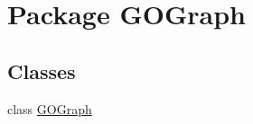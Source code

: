 \hypertarget{namespace_g_o_graph}{
\section{Package GOGraph}
\label{namespace_g_o_graph}
}
\subsection*{Classes}
\begin{DoxyCompactItemize}
\item 
class \hyperlink{class_g_o_graph_1_1_g_o_graph}{GOGraph}
\end{DoxyCompactItemize}
